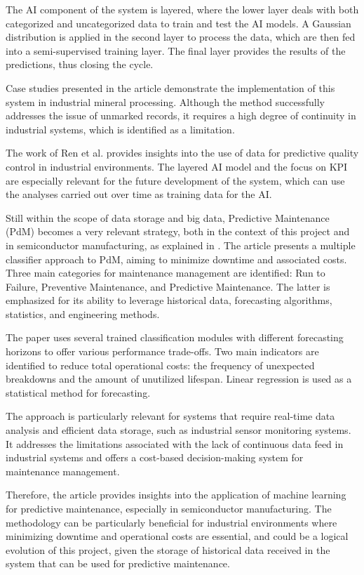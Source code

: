The \gls{AI} component of the system is layered, where the lower layer deals with both categorized and uncategorized data to train and test the AI models. A Gaussian distribution is applied in the second layer to process the data, which are then fed into a semi-supervised training layer. The final layer provides the results of the predictions, thus closing the cycle.

Case studies presented in the article demonstrate the implementation of this system in industrial mineral processing. Although the method successfully addresses the issue of unmarked records, it requires a high degree of continuity in industrial systems, which is identified as a limitation.

The work of Ren et al. provides insights into the use of data for predictive quality control in industrial environments. The layered \gls{AI} model and the focus on \gls{KPI} are especially relevant for the future development of the system, which can use the analyses carried out over time as training data for the \gls{AI}.

Still within the scope of data storage and big data, Predictive Maintenance (PdM) becomes a very relevant strategy, both in the context of this project and in semiconductor manufacturing, as explained in \cite{susto2015machine}. The article \cite{susto2015machine} presents a multiple classifier approach to PdM, aiming to minimize downtime and associated costs. Three main categories for maintenance management are identified: Run to Failure, Preventive Maintenance, and Predictive Maintenance. The latter is emphasized for its ability to leverage historical data, forecasting algorithms, statistics, and engineering methods.

The paper uses several trained classification modules with different forecasting horizons to offer various performance trade-offs. Two main indicators are identified to reduce total operational costs: the frequency of unexpected breakdowns and the amount of unutilized lifespan. Linear regression is used as a statistical method for forecasting.

The approach is particularly relevant for systems that require real-time data analysis and efficient data storage, such as industrial sensor monitoring systems. It addresses the limitations associated with the lack of continuous data feed in industrial systems and offers a cost-based decision-making system for maintenance management.

Therefore, the article provides insights into the application of machine learning for predictive maintenance, especially in semiconductor manufacturing. The methodology can be particularly beneficial for industrial environments where minimizing downtime and operational costs are essential, and could be a logical evolution of this project, given the storage of historical data received in the system that can be used for predictive maintenance.

